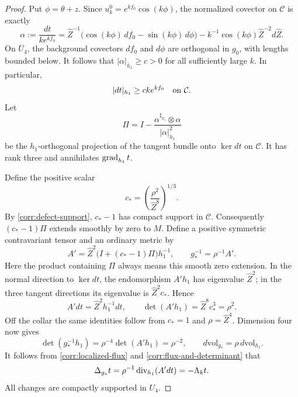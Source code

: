 \begin{proof}
Put \(\phi=\theta+z\).  Since
\(u_k^0=e^{kf_0}\cos(k\phi)\), the normalized covector on
\(\mathcal C\) is exactly
\begin{equation}\label{corr:normalized-collar-covector}
 \alpha:=\frac{dt}{ke^{kf_0}}
  =\widehat Z^{-1}
       \bigl(\cos(k\phi)\,df_0-\sin(k\phi)\,d\phi\bigr)
   -k^{-1}\cos(k\phi)\widehat Z^{-2}d\widehat Z.
\end{equation}
On \(\overline U_4\), the background covectors \(df_0\) and
\(d\phi\) are orthogonal in \(g_0\), with lengths bounded below.
It follows that \(|\alpha|_{h_1}\ge c>0\) for all sufficiently large
\(k\).  In particular,
\begin{equation}\label{corr:clean-gradient}
 |dt|_{h_1}\ge ck e^{kf_0}\quad\hbox{on }\mathcal C.
\end{equation}
Let
\[
 \Pi=I-\frac{\alpha^{\sharp_{h_1}}\otimes\alpha}
                       {|\alpha|_{h_1}^2}
\]
be the \(h_1\)-orthogonal projection of the tangent bundle onto
\(\ker dt\) on \(\mathcal C\).  It has rank three and annihilates
\(\operatorname{grad}_{h_1}t\).

Define the positive scalar
\[
 c_* =\left(\frac{\rho^2}{\widehat Z^8}\right)^{1/3}.
\]
By \eqref{corr:defect-support}, \(c_*-1\) has compact support in
\(\mathcal C\).  Consequently \((c_*-1)\Pi\) extends smoothly
by zero to \(M\).  Define a positive symmetric contravariant tensor
and an ordinary metric by
\begin{equation}\label{corr:determinant-tensor}
 A'=\widehat Z^2\bigl(I+(c_*-1)\Pi\bigr)h_1^{-1},
 \qquad g_*^{-1}=\rho^{-1}A'.
\end{equation}
Here the product containing \(\Pi\) always means this smooth zero
extension.  In the normal direction to \(\ker dt\), the endomorphism
\(A'h_1\) has eigenvalue \(\widehat Z^2\); in the three tangent
directions its eigenvalue is \(\widehat Z^2c_*\).  Hence
\begin{equation}\label{corr:flux-and-determinant}
 A'dt=\widehat Z^2h_1^{-1}dt,
 \qquad \det(A'h_1)=\widehat Z^8c_*^3=\rho^2.
\end{equation}
Off the collar the same identities follow from \(c_*=1\) and
\(\rho=\widehat Z^4\).  Dimension four now gives
\[
 \det(g_*^{-1}h_1)=\rho^{-4}\det(A'h_1)=\rho^{-2},
 \qquad d\mathrm{vol}_{g_*}=\rho\,d\mathrm{vol}_{h_1}.
\]
It follows from \eqref{corr:localized-flux} and
\eqref{corr:flux-and-determinant} that
\[
 \Delta_{g_*}t
   =\rho^{-1}\operatorname{div}_{h_1}(A'dt)=-\Lambda_kt.
\]
All changes are compactly supported in \(U_4\).


\end{proof}
